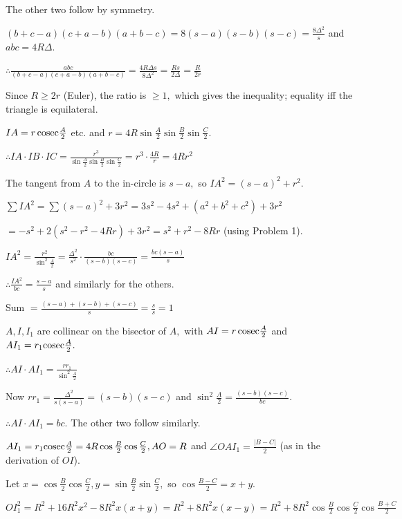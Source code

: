   The other two follow by symmetry.
\item $(b + c - a)(c + a - b)(a + b - c) = 8(s - a)(s - b)(s - c) = \frac{8\Delta^2}{s}$ and $abc = 4R\Delta.$

  $\therefore \frac{abc}{(b + c - a)(c + a - b)(a + b - c)} = \frac{4R\Delta s}{8\Delta^2} = \frac{Rs}{2\Delta} =
  \frac{R}{2r}$

  Since $R\geq 2r$ (Euler), the ratio is $\geq 1,$ which gives the inequality; equality iff the triangle is equilateral.
\item $IA = r\,{\rm cosec}\frac{A}{2}$ etc. and $r = 4R\sin\frac{A}{2}\sin\frac{B}{2}\sin\frac{C}{2}.$

  $\therefore IA\cdot IB\cdot IC = \frac{r^3}{\sin\frac{A}{2}\sin\frac{B}{2}\sin\frac{C}{2}} = r^3\cdot\frac{4R}{r} = 4Rr^2$

  The tangent from $A$ to the in-circle is $s - a,$ so $IA^2 = (s - a)^2 + r^2.$

  $\sum IA^2 = \sum (s - a)^2 + 3r^2 = 3s^2 - 4s^2 + (a^2 + b^2 + c^2) + 3r^2$

  $= -s^2 + 2(s^2 - r^2 - 4Rr) + 3r^2 = s^2 + r^2 - 8Rr$ (using Problem 1).
\item $IA^2 = \frac{r^2}{\sin^2\frac{A}{2}} = \frac{\Delta^2}{s^2}\cdot\frac{bc}{(s - b)(s - c)} = \frac{bc(s - a)}{s}$

  $\therefore \frac{IA^2}{bc} = \frac{s - a}{s}$ and similarly for the others.

  Sum $= \frac{(s - a) + (s - b) + (s - c)}{s} = \frac{s}{s} = 1$
\item $A, I, I_1$ are collinear on the bisector of $A,$ with $AI = r\,{\rm cosec}\frac{A}{2}$ and $AI_1 = r_1{\rm
  cosec}\frac{A}{2}.$

  $\therefore AI\cdot AI_1 = \frac{rr_1}{\sin^2\frac{A}{2}}$

  Now $rr_1 = \frac{\Delta^2}{s(s - a)} = (s - b)(s - c)$ and $\sin^2\frac{A}{2} = \frac{(s - b)(s - c)}{bc}.$

  $\therefore AI\cdot AI_1 = bc.$ The other two follow similarly.
\item $AI_1 = r_1{\rm cosec}\frac{A}{2} = 4R\cos\frac{B}{2}\cos\frac{C}{2}, AO = R$ and $\angle OAI_1 = \frac{|B - C|}{2}$ (as in
  the derivation of $OI$).

  Let $x = \cos\frac{B}{2}\cos\frac{C}{2}, y = \sin\frac{B}{2}\sin\frac{C}{2},$ so $\cos\frac{B - C}{2} = x + y.$

  $OI_1^2 = R^2 + 16R^2x^2 - 8R^2x(x + y) = R^2 + 8R^2x(x - y) = R^2 + 8R^2\cos\frac{B}{2}\cos\frac{C}{2}\cos\frac{B +
  C}{2}$

